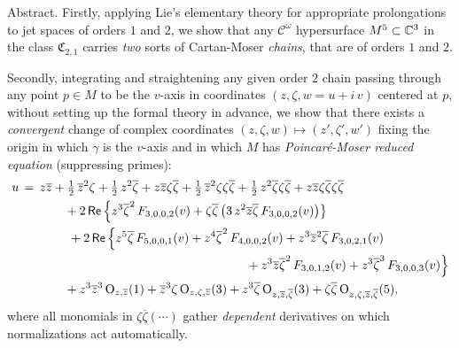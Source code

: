\documentclass[12pt,twoside,leqno,openany]{amsart}
\begin{document}
\begin{center}
\begin{minipage}[t]{12.5cm}
\parindent 0.53cm
\footnotesize
\noindent
{\sc Abstract}.
Firstly, 
applying Lie's elementary theory for appropriate prolongations to jet
spaces of orders $1$ and $2$, we show that any
$\mathcal{C}^\omega$ hypersurface $M^5 \subset \mathbb{C}^3$ in the class
$\mathfrak{C}_{2,1}$ carries {\em two} sorts of Cartan-Moser {\sl
chains}, that are of orders $1$ and $2$.

Secondly, integrating and straightening any given order $2$ chain
passing through any point $p \in M$ to be the $v$-axis in coordinates
$(z, \zeta, w = u + i\, v)$ centered at $p$, without setting up the
formal theory in advance, we show that there exists a {\em convergent}
change of complex coordinates $(z, \zeta, w) \longmapsto (z', \zeta',
w')$ fixing the origin in which $\gamma$ is the $v$-axis and in which
$M$ has {\em Poincar\'e-Moser reduced equation} (suppressing primes):
\[
\aligned
u
&
\,=\,
z\overline{z}
+
\tfrac{1}{2}\,{\overline{z}}^2\zeta
+
\tfrac{1}{2}\,{z}^2\overline{\zeta}
+
z\overline{z}\zeta\overline{\zeta}
+
\tfrac{1}{2}\,{\overline{z}}^2\zeta\zeta\overline{\zeta}
+
\tfrac{1}{2}\,{z}^2\overline{\zeta}\zeta\overline{\zeta}
+
z\overline{z}\zeta\overline{\zeta}\zeta\overline{\zeta}
\notag
\\
&
\ \ \ \ \ \ \ \ \ \ \ 
+
2\,\Resmall\,
\Big\{
{z}^3{\overline{\zeta}}^2\,
F_{3,0,0,2}(v)
+
\zeta\overline{\zeta}\,
\big(
3\,{z}^2\overline{z}\overline{\zeta}\,
F_{3,0,0,2}(v)
\big)
\big\}
\notag
\\
&
\ \ \ \ \ \ \ \ \ \ \ \ 
+
2\,\Resmall\,
\Big\{
{z}^5\overline{\zeta}\,
F_{5,0,0,1}(v)
+
{z}^4{\overline{\zeta}}^2\,
F_{4,0,0,2}(v)
+
{z}^3{\overline{z}}^2\overline{\zeta}\,
F_{3,0,2,1}(v)
\\
&
\ \ \ \ \ \ \ \ \ \ \ \ \ \ \ \ \ \ \ \ \ \ \ \ \ \ \ \ \ \ \ \ \ \ \
\ \ \ \ \ \ \ \ \ \ \ \ \ \ \ \ \ \ \ \
+
{z}^3\overline{z}{\overline{\zeta}}^2\,
F_{3,0,1,2}(v)
+
{z}^3{\overline{\zeta}}^3\,
F_{3,0,0,3}(v)
\Big\}
\notag
\\
&
\ \ \ \ \ \ \ \ \ \ \ 
+
{z}^3{\overline{z}}^3\,
{\rm O}_{z,\overline{z}}(1)
+
{\overline{z}}^3\zeta\,
{\rm O}_{z,\zeta,\overline{z}}(3)
+
{z}^3\overline{\zeta}\,
{\rm O}_{z,\overline{z},\overline{\zeta}}(3)
+
\zeta\overline{\zeta}\,
{\rm O}_{z,\zeta,\overline{z},\overline{\zeta}}(5),
\endaligned
\]
where all monomials 
in $\zeta \overline{\zeta} (\cdots)$ gather {\em dependent} 
derivatives on which normalizations act automatically.


\end{minipage}
\end{center}
\end{document}
